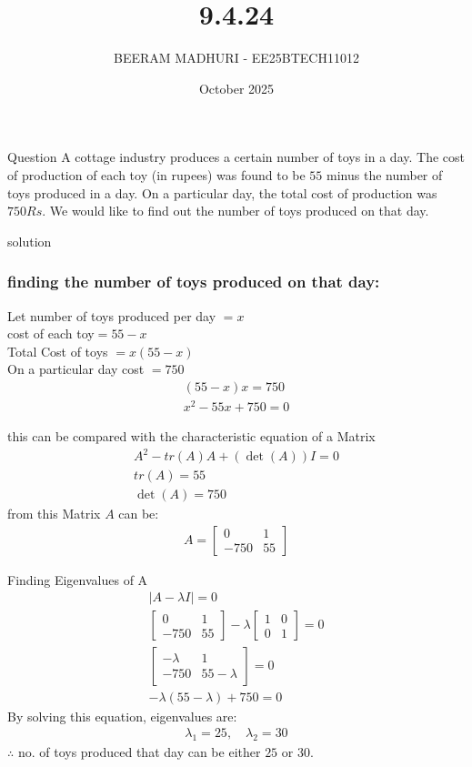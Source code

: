 \documentclass{beamer}
\title %
{9.4.24}
\date{October  2025}
\author %
{BEERAM MADHURI - EE25BTECH11012}
\begin{document}
\frame{\titlepage}
\begin{frame}{Question}
A cottage industry produces a certain number of toys in a day. The cost of production of each toy (in rupees) was found to be $55$ minus the number of toys produced in a day. On a particular day, the total cost of production was $750Rs$. We would like to find out the number of toys produced on that day.
\end{frame}
 
\begin{frame}{solution}
    \frametitle{finding the number of toys produced on that day:}
Let number of toys produced per day $= x$ \\
cost of each toy$= 55-x$ \\
Total Cost of toys $= x(55-x)$ \\

On a particular day cost $= 750$ 
\begin{align}
(55-x) x = 750 \\
x^2 - 55x + 750 = 0
\end{align}
\end{frame}
\begin{frame} 
this can be compared with the characteristic equation of a Matrix
\begin{align}
A^2 - tr(A) A + (\det(A)) I = 0 \\
tr(A) = 55 \\
\det (A)= 750 
\end{align}
from this Matrix $A$ can be: \\
\begin{align}
A = \begin{bmatrix}0 & 1 \\-750 & 55\end{bmatrix}
\end{align}
\end{frame}
\begin{frame}
Finding Eigenvalues of A
\begin{align}
|A - \lambda I| = 0\\
\begin{bmatrix}0 & 1 \\-750 & 55\end{bmatrix} - \lambda \begin{bmatrix}1 & 0 \\0 & 1\end{bmatrix} = 0\\
\begin{bmatrix}-\lambda & 1 \\-750 & 55 - \lambda\end{bmatrix} = 0\\
-\lambda(55 - \lambda) + 750 = 0
\end{align}
By solving this equation, eigenvalues are:
\begin{align}
\lambda_1 = 25, \quad \lambda_2 = 30
\end{align}
$\therefore$ no. of toys produced that day can be either $25$ or $30$.
\end{frame}
\end{document}
